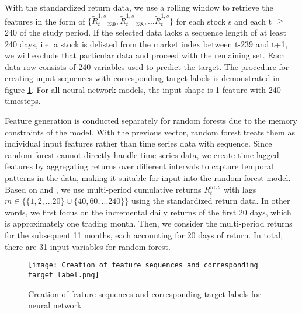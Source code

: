 \documentclass{article}
\begin{document}
With the standardized return data, we use a rolling window to retrieve the features in the form of  $\{\tilde{R}^{1,s}_{t-239},\tilde{R}^{1,s}_{t-238},...\tilde{R}^{1,s}_{t}\}$ for each stock s and each t $\geq$ 240 of the study period. If the selected data lacks a sequence length of at least 240 days, i.e. a stock is delisted from the market index between t-239 and t+1, we will exclude that particular data and proceed with the remaining set. Each data row consists of 240 variables used to predict the target. The procedure for creating input sequences with corresponding target labels is demonstrated in figure \ref{fig creation feature sequence}. For all neural network models, the input shape is 1 feature with 240 timesteps.

Feature generation is conducted separately for random forests due to the memory constraints of the model. With the previous vector, random forest treats them as individual input features rather than time series data with sequence. Since random forest cannot directly handle time series data, we create time-lagged features by aggregating returns over different intervals to capture temporal patterns in the data, making it suitable for input into the random forest model. Based on \cite{takeuchi2013applying} and \cite{krauss2017deep}, we use multi-period cumulative returns $R^{m,s}_t$ with lags $m \in \{\{1,2,...20\} \cup \{40,60,...240\}\} $ using the standardized return data. In other words, we first focus on the incremental daily returns of the first 20 days, which is approximately one trading month. Then, we consider the multi-period returns for the subsequent 11 months, each accounting for 20 days of return. In total, there are 31 input variables for random forest. 

\begin{figure}
  \texttt{[image: Creation of feature sequences and corresponding target label.png]}
  \caption{Creation of feature sequences and corresponding target labels for neural network}
  \label{fig creation feature sequence}
\end{figure}
\end{document}

